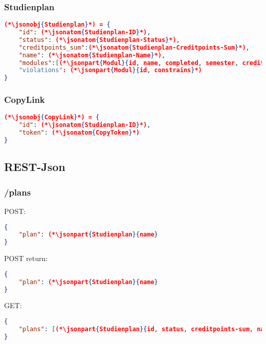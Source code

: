 \subsubsection{Studienplan}
\begin{lstlisting}[language=json,firstnumber=1]
(*\jsonobj{Studienplan}*) = {
	"id": (*\jsonatom{Studienplan-ID}*),
	"status": (*\jsonatom{Studienplan-Status}*),
	"creditpoints_sum":(*\jsonatom{Studienplan-Creditpoints-Sum}*),
	"name": (*\jsonatom{Studienplan-Name}*),
	"modules":[(*\jsonpart{Modul}{id, name, completed, semester, creditpoints, lecturer}*), ...]
	"violations": (*\jsonpart{Modul}{id, constrains}*)	
}
\end{lstlisting}

\subsubsection{CopyLink}
\begin{lstlisting}[language=json,firstnumber=1]
(*\jsonobj{CopyLink}*) = {
	"id": (*\jsonatom{Studienplan-ID}*),
	"token": (*\jsonatom{CopyToken}*)
}
\end{lstlisting}


\subsection{REST-Json}

\subsubsection{/plans}
POST:
\begin{lstlisting}[language=json,firstnumber=1]
{
	"plan": (*\jsonpart{Studienplan}{name}
}
\end{lstlisting}
POST return:
\begin{lstlisting}[language=json,firstnumber=1]
{
	"plan": (*\jsonpart{Studienplan}{name}
}
\end{lstlisting}
GET:
\begin{lstlisting}[language=json,firstnumber=1]
{
	"plans": [(*\jsonpart{Studienplan}{id, status, creditpoints-sum, name}*), ...]
}
\end{lstlisting}

